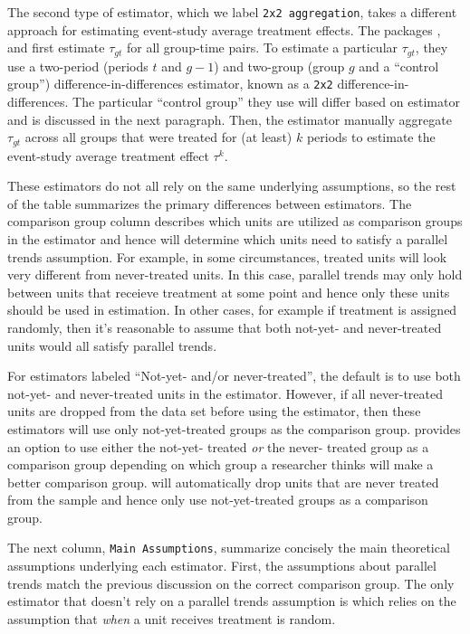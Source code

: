 The second type of estimator, which we label \texttt{2x2\ aggregation},
takes a different approach for estimating event-study average treatment
effects. The packages  \citep{did},  and
 \citep{staggered} first estimate \(\tau_{gt}\) for
all group-time pairs. To estimate a particular \(\tau_{gt}\), they use a
two-period (periods \(t\) and \(g-1\)) and two-group (group \(g\) and a
``control group'') difference-in-differences estimator, known as a
\texttt{2x2} difference-in-differences. The particular ``control group''
they use will differ based on estimator and is discussed in the next
paragraph. Then, the estimator manually aggregate \(\tau_{gt}\) across
all groups that were treated for (at least) \(k\) periods to estimate
the event-study average treatment effect \(\tau^k\).

These estimators do not all rely on the same underlying assumptions, so
the rest of the table summarizes the primary differences between
estimators. The comparison group column describes which units are
utilized as comparison groups in the estimator and hence will determine
which units need to satisfy a parallel trends assumption. For example,
in some circumstances, treated units will look very different from
never-treated units. In this case, parallel trends may only hold between
units that receieve treatment at some point and hence only these units
should be used in estimation. In other cases, for example if treatment
is assigned randomly, then it's reasonable to assume that both not-yet-
and never-treated units would all satisfy parallel trends.

For estimators labeled ``Not-yet- and/or never-treated'', the default is
to use both not-yet- and never-treated units in the estimator. However,
if all never-treated units are dropped from the data set before using
the estimator, then these estimators will use only not-yet-treated
groups as the comparison group.  provides an option to use
either the not-yet- treated \emph{or} the never- treated group as a
comparison group depending on which group a researcher thinks will make
a better comparison group.  will automatically drop
units that are never treated from the sample and hence only use
not-yet-treated groups as a comparison group.

The next column, \texttt{Main\ Assumptions}, summarize concisely the
main theoretical assumptions underlying each estimator. First, the
assumptions about parallel trends match the previous discussion on the
correct comparison group. The only estimator that doesn't rely on a
parallel trends assumption is  which relies on the
assumption that \emph{when} a unit receives treatment is random.

